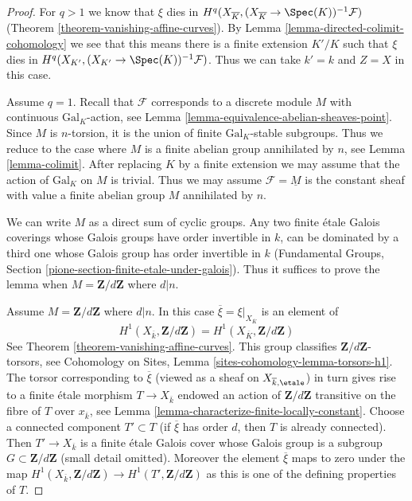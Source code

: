 \begin{proof}
For $q > 1$ we know that $\xi$ dies in
$H^q(X_{\overline{K}}, (X_{\overline{K}} \to \Spec(K))^{-1}\mathcal{F})$
(Theorem \ref{theorem-vanishing-affine-curves}).
By Lemma \ref{lemma-directed-colimit-cohomology} we see that
this means there is a finite extension $K'/K$ such that
$\xi$ dies in $H^q(X_{K'}, (X_{K'} \to \Spec(K))^{-1}\mathcal{F})$.
Thus we can take $k' = k$ and $Z = X$ in this case.

\medskip\noindent
Assume $q = 1$. Recall that $\mathcal{F}$ corresponds to a
discrete module $M$ with continuous $\text{Gal}_K$-action, see
Lemma \ref{lemma-equivalence-abelian-sheaves-point}.
Since $M$ is $n$-torsion, it is the union of finite
$\text{Gal}_K$-stable subgroups. Thus
we reduce to the case where $M$ is a finite abelian group annihilated by $n$,
see Lemma \ref{lemma-colimit}. After replacing $K$ by a finite extension
we may assume that the action of $\text{Gal}_K$ on $M$ is trivial.
Thus we may assume $\mathcal{F} = \underline{M}$ is the constant
sheaf with value a finite abelian group $M$ annihilated by $n$.

\medskip\noindent
We can write $M$ as a direct sum of cyclic groups.
Any two finite \'etale Galois coverings whose Galois groups
have order invertible in $k$, can be dominated by a third one whose
Galois group has order invertible in $k$
(Fundamental Groups, Section \ref{pione-section-finite-etale-under-galois}).
Thus it suffices to prove the lemma when
$M = \mathbf{Z}/d\mathbf{Z}$ where $d | n$.

\medskip\noindent
Assume $M = \mathbf{Z}/d\mathbf{Z}$ where $d | n$.
In this case $\overline{\xi} = \xi|_{X_{\overline{K}}}$ is an element of
$$
H^1(X_{\overline{k}}, \mathbf{Z}/d\mathbf{Z}) =
H^1(X_{\overline{K}}, \mathbf{Z}/d\mathbf{Z})
$$
See Theorem \ref{theorem-vanishing-affine-curves}.
This group classifies $\mathbf{Z}/d\mathbf{Z}$-torsors, see
Cohomology on Sites, Lemma \ref{sites-cohomology-lemma-torsors-h1}.
The torsor corresponding to $\overline{\xi}$ (viewed as a sheaf on
$X_{\overline{k}, \etale}$) in turn gives rise to a finite \'etale morphism
$T \to X_{\overline{k}}$ endowed an action of $\mathbf{Z}/d\mathbf{Z}$
transitive on the fibre of $T$ over $x_{\overline{k}}$, see
Lemma \ref{lemma-characterize-finite-locally-constant}.
Choose a connected component $T' \subset T$ (if $\overline{\xi}$ has
order $d$, then $T$ is already connected).
Then $T' \to X_{\overline{k}}$ is a finite \'etale Galois
cover whose Galois group is a subgroup $G \subset \mathbf{Z}/d\mathbf{Z}$
(small detail omitted). Moreover the element $\overline{\xi}$ maps to zero
under the map $H^1(X_{\overline{k}}, \mathbf{Z}/d\mathbf{Z}) \to
H^1(T', \mathbf{Z}/d\mathbf{Z})$ as this is one
of the defining properties of $T$.


\end{proof}
